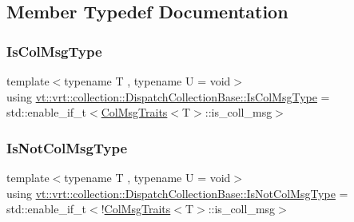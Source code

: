 \subsection{Member Typedef Documentation}
\mbox{\label{structvt_1_1vrt_1_1collection_1_1_dispatch_collection_base_a637f8dbdc7970f9991e98e43ff4cf2fe}} 
\subsubsection{\texorpdfstring{Is\+Col\+Msg\+Type}{IsColMsgType}}
{\footnotesize\ttfamily template$<$typename T , typename U  = void$>$ \\
using \hyperlink{structvt_1_1vrt_1_1collection_1_1_dispatch_collection_base_a637f8dbdc7970f9991e98e43ff4cf2fe}{vt\+::vrt\+::collection\+::\+Dispatch\+Collection\+Base\+::\+Is\+Col\+Msg\+Type} =  std\+::enable\+\_\+if\+\_\+t$<$\hyperlink{structvt_1_1vrt_1_1collection_1_1_col_msg_traits}{Col\+Msg\+Traits}$<$T$>$\+::is\+\_\+coll\+\_\+msg$>$}

\mbox{\label{structvt_1_1vrt_1_1collection_1_1_dispatch_collection_base_a0e06b294a83d7d0420614237a2db9814}} 
\subsubsection{\texorpdfstring{Is\+Not\+Col\+Msg\+Type}{IsNotColMsgType}}
{\footnotesize\ttfamily template$<$typename T , typename U  = void$>$ \\
using \hyperlink{structvt_1_1vrt_1_1collection_1_1_dispatch_collection_base_a0e06b294a83d7d0420614237a2db9814}{vt\+::vrt\+::collection\+::\+Dispatch\+Collection\+Base\+::\+Is\+Not\+Col\+Msg\+Type} =  std\+::enable\+\_\+if\+\_\+t$<$!\hyperlink{structvt_1_1vrt_1_1collection_1_1_col_msg_traits}{Col\+Msg\+Traits}$<$T$>$\+::is\+\_\+coll\+\_\+msg$>$}



